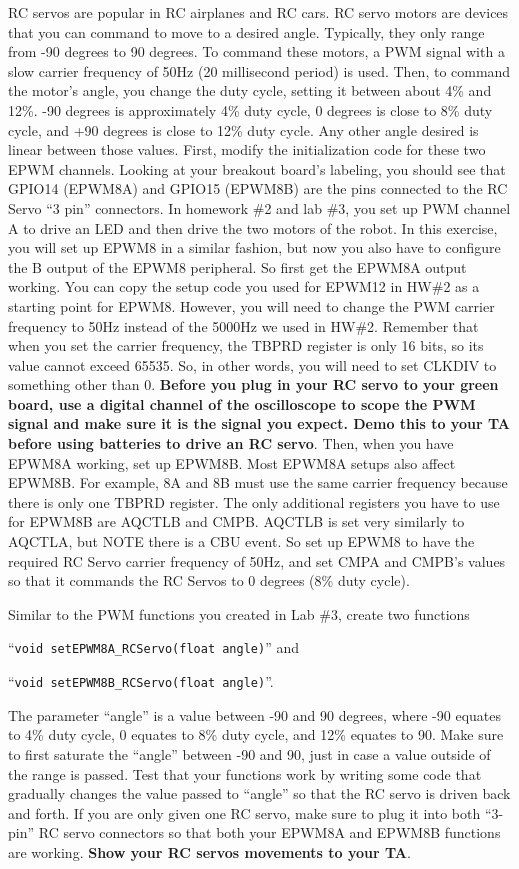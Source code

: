 \documentclass[11pt]{article}
\begin{document}
RC servos are popular in RC airplanes and RC cars. RC servo motors are devices that you can command to move to a desired angle. Typically, they only range from -90 degrees to 90 degrees. To command these motors, a PWM signal with a slow carrier frequency of 50Hz (20 millisecond period) is used. Then, to command the motor's angle, you change the duty cycle, setting it between about 4\% and 12\%. -90 degrees is approximately 4\% duty cycle, 0 degrees is close to 8\% duty cycle, and +90 degrees is close to 12\% duty cycle. Any other angle desired is linear between those values. First, modify the initialization code for these two EPWM channels. Looking at your breakout board’s labeling, you should see that GPIO14 (EPWM8A) and GPIO15 (EPWM8B) are the pins connected to the RC Servo “3 pin” connectors. In homework \#2 and lab \#3, you set up PWM channel A to drive an LED and then drive the two motors of the robot. In this exercise, you will set up EPWM8 in a similar fashion, but now you also have to configure the B output of the EPWM8 peripheral. So first get the EPWM8A output working. You can copy the setup code you used for EPWM12 in HW\#2 as a starting point for EPWM8. However, you will need to change the PWM carrier frequency to 50Hz instead of the 5000Hz we used in HW\#2. Remember that when you set the carrier frequency, the TBPRD register is only 16 bits, so its value cannot exceed 65535. So, in other words, you will need to set CLKDIV to something other than 0. \textbf{Before you plug in your RC servo to your green board, use a digital channel of the oscilloscope to scope the PWM signal and make sure it is the signal you expect.
Demo this to your TA before using batteries to drive an RC servo}. Then, when you have EPWM8A working, set up EPWM8B. Most EPWM8A setups also affect EPWM8B. For example, 8A and 8B must use the same carrier frequency because there is only one TBPRD register. The only additional registers you have to use for EPWM8B are AQCTLB and CMPB. AQCTLB is set very similarly to AQCTLA, but NOTE there is a CBU event. So set up EPWM8 to have the required RC Servo carrier frequency of 50Hz, and set CMPA and CMPB’s values so that it commands the RC Servos to 0 degrees (8\% duty cycle).

Similar to the PWM functions you created in Lab \#3, create two functions
\par
“\texttt{void setEPWM8A_RCServo(float angle)}” and
\par
“\texttt{void setEPWM8B_RCServo(float angle)}”.

The parameter “angle” is a value between -90 and 90 degrees, where -90 equates to 4\% duty cycle, 0 equates to 8\% duty cycle, and 12\% equates to 90. Make sure to first saturate the “angle” between    -90 and 90, just in case a value outside of the range is passed. Test that your functions work by writing some code that gradually changes the value passed to “angle” so that the RC servo is driven back and forth. If you are only given one RC servo, make sure to plug it into both “3-pin” RC servo connectors so that both your EPWM8A and EPWM8B functions are working. \textbf{Show your RC servos movements to your TA}.
\end{document}
